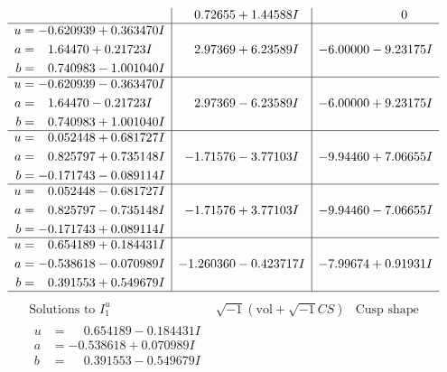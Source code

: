 \documentclass[1p]{elsarticle_modified}
\theoremstyle{definition}
\newcommand{\I}{\sqrt{-1}}
\begin{document}
$$\begin{array}{c|c|c}
 & \phantom{-}0.72655 + 1.44588 I & \phantom{-0.000000 } 0 \\ \hline\begin{aligned}
u &= -0.620939 + 0.363470 I \\
a &= \phantom{-}1.64470 + 0.21723 I \\
b &= \phantom{-}0.740983 - 1.001040 I\end{aligned}
 & \phantom{-}2.97369 + 6.23589 I & -6.00000 - 9.23175 I \\ \hline\begin{aligned}
u &= -0.620939 - 0.363470 I \\
a &= \phantom{-}1.64470 - 0.21723 I \\
b &= \phantom{-}0.740983 + 1.001040 I\end{aligned}
 & \phantom{-}2.97369 - 6.23589 I & -6.00000 + 9.23175 I \\ \hline\begin{aligned}
u &= \phantom{-}0.052448 + 0.681727 I \\
a &= \phantom{-}0.825797 + 0.735148 I \\
b &= -0.171743 - 0.089114 I\end{aligned}
 & -1.71576 - 3.77103 I & -9.94460 + 7.06655 I \\ \hline\begin{aligned}
u &= \phantom{-}0.052448 - 0.681727 I \\
a &= \phantom{-}0.825797 - 0.735148 I \\
b &= -0.171743 + 0.089114 I\end{aligned}
 & -1.71576 + 3.77103 I & -9.94460 - 7.06655 I \\ \hline\begin{aligned}
u &= \phantom{-}0.654189 + 0.184431 I \\
a &= -0.538618 - 0.070989 I \\
b &= \phantom{-}0.391553 + 0.549679 I\end{aligned}
 & -1.260360 - 0.423717 I & -7.99674 + 0.91931 I\\
 \hline 
 \end{array}$$\newpage$$\begin{array}{c|c|c}  
\text{Solutions to }I^u_{1}& \I (\text{vol} + \sqrt{-1}CS) & \text{Cusp shape}\\
 \hline 
\begin{aligned}
u &= \phantom{-}0.654189 - 0.184431 I \\
a &= -0.538618 + 0.070989 I \\
b &= \phantom{-}0.391553 - 0.549679 I\end{aligned}

\end{array}$$
\end{document}
